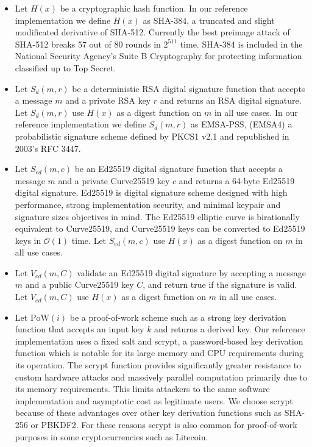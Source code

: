 \begin{itemize}
	\item Let $ H(x) $ be a cryptographic hash function. In our reference implementation we define $ H(x) $ as SHA-384, a truncated and slight modificated derivative of SHA-512. Currently the best preimage attack of SHA-512 breaks 57 out of 80 rounds in $ 2^{511} $ time.\cite{li2012converting} SHA-384 is included in the National Security Agency's Suite B Cryptography for protecting information classified up to Top Secret.
	\item Let $ S_{d}(m, r) $ be a deterministic RSA digital signature function that accepts a message $ m $ and a private RSA key $ r $ and returns an RSA digital signature. Let $ S_{d}(m, r) $ use $ H(x) $ as a digest function on $ m $ in all use cases. In our reference implementation we define $ S_{d}(m, r) $ as EMSA-PSS, (EMSA4) a probabilistic signature scheme defined by PKCS1 v2.1 and republished in 2003's RFC 3447.
	\item Let $ S_{\mathit{ed}}(m, c) $ be an Ed25519 digital signature function that accepts a message $ m $ and a private Curve25519 key $ c $ and returns a 64-byte Ed25519 digital signature. Ed25519 is digital signature scheme designed with high performance, strong implementation security, and minimal keypair and signature sizes objectives in mind. The Ed25519 elliptic curve is birationally equivalent to Curve25519, and Curve25519 keys can be converted to Ed25519 keys in $ \mathcal{O}(1) $ time.\cite{bernstein2011high} Let $ S_{\mathit{ed}}(m, c) $ use $ H(x) $ as a digest function on $ m $ in all use cases.
	\item Let $ V_{\mathit{ed}}(m, C) $ validate an Ed25519 digital signature by accepting a message $ m $ and a public Curve25519 key $ C $, and return true if the signature is valid. Let $ V_{\mathit{ed}}(m, C) $ use $ H(x) $ as a digest function on $ m $ in all use cases.
	\item Let $ \mathrm{PoW}(i) $ be a proof-of-work scheme such as a strong key derivation function that accepts an input key $ k $ and returns a derived key. Our reference implementation uses a fixed salt and scrypt, a password-based key derivation function which is notable for its large memory and CPU requirements during its operation. The scrypt function provides significantly greater resistance to custom hardware attacks and massively parallel computation primarily due to its memory requirements. This limits attackers to the same software implementation and asymptotic cost as legitimate users.\cite{percival2009stronger}\cite{percival2012scrypt} We choose scrypt because of these advantages over other key derivation functions such as SHA-256 or PBKDF2. For these reasons scrypt is also common for proof-of-work purposes in some cryptocurrencies such as Litecoin.

\end{itemize}

